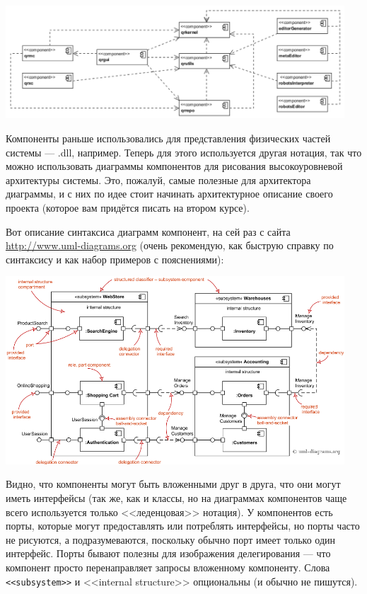 \documentclass{../../text-style}
\begin{document}
\begin{center}
    \includegraphics[width=0.95\textwidth]{componentDiagram.png}
\end{center}

Компоненты раньше использовались для представления физических частей системы --- .dll, например. Теперь для этого используется другая нотация, так что можно использовать диаграммы компонентов для рисования высокоуровневой архитектуры системы. Это, пожалуй, самые полезные для архитектора диаграммы, и с них по идее стоит начинать архитектурное описание своего проекта (которое вам придётся писать на втором курсе).

Вот описание синтаксиса диаграмм компонент, на сей раз с сайта \url{http://www.uml-diagrams.org} (очень рекомендую, как быструю справку по синтаксису и как набор примеров с пояснениями):

\begin{center}
    \includegraphics[width=0.95\textwidth]{componentDiagramsOverview.png}
\end{center}

Видно, что компоненты могут быть вложенными друг в друга, что они могут иметь интерфейсы (так же, как и классы, но на диаграммах компонентов чаще всего используется только <<леденцовая>> нотация). У компонентов есть порты, которые могут предоставлять или потреблять интерфейсы, но порты часто не рисуются, а подразумеваются, поскольку обычно порт имеет только один интерфейс. Порты бывают полезны для изображения делегирования --- что компонент просто перенаправляет запросы вложенному компоненту. Слова \verb|<<subsystem>>| и <<internal structure>> опциональны (и обычно не пишутся).
\end{document}
